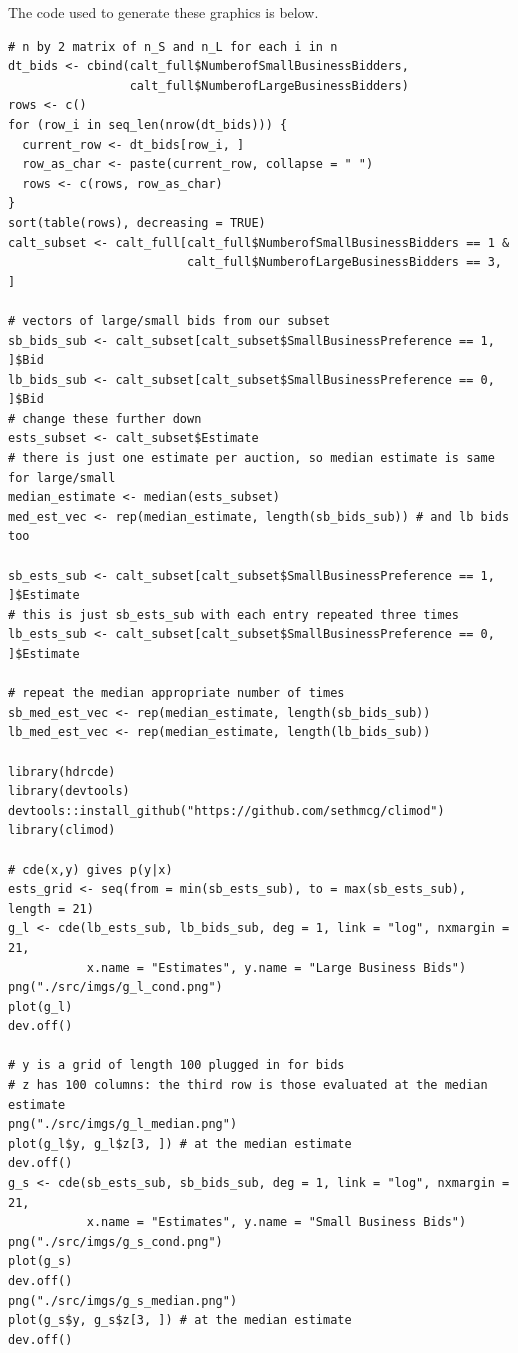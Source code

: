 \hspace{10cm}
\newpage
\hspace{5cm}
\newpage
The code used to generate these graphics is below.

\begin{lstlisting}
# n by 2 matrix of n_S and n_L for each i in n
dt_bids <- cbind(calt_full$NumberofSmallBusinessBidders,
                 calt_full$NumberofLargeBusinessBidders)
rows <- c()
for (row_i in seq_len(nrow(dt_bids))) {
  current_row <- dt_bids[row_i, ]
  row_as_char <- paste(current_row, collapse = " ")
  rows <- c(rows, row_as_char)
}
sort(table(rows), decreasing = TRUE)
calt_subset <- calt_full[calt_full$NumberofSmallBusinessBidders == 1 &
                         calt_full$NumberofLargeBusinessBidders == 3, ]

# vectors of large/small bids from our subset
sb_bids_sub <- calt_subset[calt_subset$SmallBusinessPreference == 1, ]$Bid
lb_bids_sub <- calt_subset[calt_subset$SmallBusinessPreference == 0, ]$Bid
# change these further down
ests_subset <- calt_subset$Estimate
# there is just one estimate per auction, so median estimate is same for large/small
median_estimate <- median(ests_subset)
med_est_vec <- rep(median_estimate, length(sb_bids_sub)) # and lb bids too

sb_ests_sub <- calt_subset[calt_subset$SmallBusinessPreference == 1, ]$Estimate
# this is just sb_ests_sub with each entry repeated three times
lb_ests_sub <- calt_subset[calt_subset$SmallBusinessPreference == 0, ]$Estimate

# repeat the median appropriate number of times
sb_med_est_vec <- rep(median_estimate, length(sb_bids_sub))
lb_med_est_vec <- rep(median_estimate, length(lb_bids_sub))

library(hdrcde)
library(devtools)
devtools::install_github("https://github.com/sethmcg/climod")
library(climod)

# cde(x,y) gives p(y|x)
ests_grid <- seq(from = min(sb_ests_sub), to = max(sb_ests_sub), length = 21)
g_l <- cde(lb_ests_sub, lb_bids_sub, deg = 1, link = "log", nxmargin = 21,
           x.name = "Estimates", y.name = "Large Business Bids")
png("./src/imgs/g_l_cond.png")
plot(g_l)
dev.off()

# y is a grid of length 100 plugged in for bids
# z has 100 columns: the third row is those evaluated at the median estimate
png("./src/imgs/g_l_median.png")
plot(g_l$y, g_l$z[3, ]) # at the median estimate
dev.off()
g_s <- cde(sb_ests_sub, sb_bids_sub, deg = 1, link = "log", nxmargin = 21,
           x.name = "Estimates", y.name = "Small Business Bids")
png("./src/imgs/g_s_cond.png")
plot(g_s)
dev.off()
png("./src/imgs/g_s_median.png")
plot(g_s$y, g_s$z[3, ]) # at the median estimate
dev.off()


\end{lstlisting}
